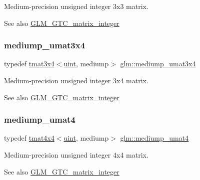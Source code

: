 Medium-\/precision unsigned integer 3x3 matrix. \begin{DoxySeeAlso}{See also}
\hyperlink{group__gtc__matrix__integer}{G\+L\+M\+\_\+\+G\+T\+C\+\_\+matrix\+\_\+integer} 
\end{DoxySeeAlso}
\mbox{\label{group__gtc__matrix__integer_ga21a2361cc10822ad1a2297ac286c8e26}} 
\subsubsection{\texorpdfstring{mediump\+\_\+umat3x4}{mediump\_umat3x4}}
{\footnotesize\ttfamily typedef \hyperlink{structglm_1_1tmat3x4}{tmat3x4}$<$\hyperlink{group__core__precision_ga4fd29415871152bfb5abd588334147c8}{uint}, mediump$>$ \hyperlink{group__gtc__matrix__integer_ga21a2361cc10822ad1a2297ac286c8e26}{glm\+::mediump\+\_\+umat3x4}}

Medium-\/precision unsigned integer 3x4 matrix. \begin{DoxySeeAlso}{See also}
\hyperlink{group__gtc__matrix__integer}{G\+L\+M\+\_\+\+G\+T\+C\+\_\+matrix\+\_\+integer} 
\end{DoxySeeAlso}
\mbox{\label{group__gtc__matrix__integer_ga3eb3a5d85ec876ba65fad5525a5dda56}} 
\subsubsection{\texorpdfstring{mediump\+\_\+umat4}{mediump\_umat4}}
{\footnotesize\ttfamily typedef \hyperlink{structglm_1_1tmat4x4}{tmat4x4}$<$\hyperlink{group__core__precision_ga4fd29415871152bfb5abd588334147c8}{uint}, mediump$>$ \hyperlink{group__gtc__matrix__integer_ga3eb3a5d85ec876ba65fad5525a5dda56}{glm\+::mediump\+\_\+umat4}}

Medium-\/precision unsigned integer 4x4 matrix. \begin{DoxySeeAlso}{See also}
\hyperlink{group__gtc__matrix__integer}{G\+L\+M\+\_\+\+G\+T\+C\+\_\+matrix\+\_\+integer} 
\end{DoxySeeAlso}
\mbox{\label{group__gtc__matrix__integer_ga9dd5ce011ca43d90cf1b94084c7e90ac}} 

